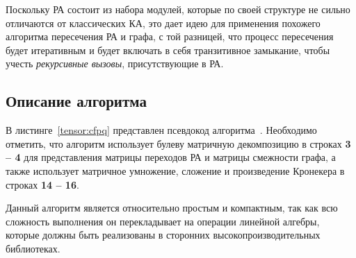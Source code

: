 Поскольку РА состоит из набора модулей, которые по своей структуре не сильно отличаются от классических КА, это дает идею для применения похожего алгоритма пересечения РА и графа, с той  разницей, что процесс пересечения будет итеративным и будет включать в себя транзитивное замыкание, чтобы учесть \textit{рекурсивные вызовы}, присутствующие в РА. 

\subsection{Описание алгоритма}

В листинге~\ref{tensor:cfpq} представлен псевдокод алгоритма~\cite{inbook:kronecker_cfpq_adbis}. Необходимо отметить, что алгоритм использует булеву матричную декомпозицию в строках \textbf{3 -- 4} для представления матрицы переходов РА и матрицы смежности графа, а также использует матричное умножение, сложение и произведение Кронекера в строках \textbf{14 -- 16}.

Данный алгоритм является относительно простым и компактным, так как всю сложность выполнения он перекладывает на операции линейной алгебры, которые должны быть реализованы в сторонних высокопроизводительных библиотеках.

